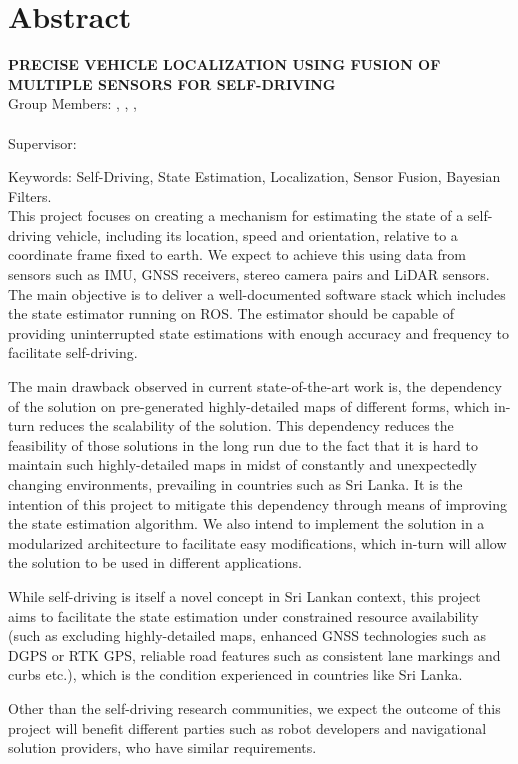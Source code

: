 \chapter*{Abstract}

\begin{center}
	\vspace{5mm}
	\MakeUppercase{\textbf{Precise Vehicle Localization Using Fusion of Multiple Sensors for Self-Driving}}\\
	\vspace{5mm}
	Group Members: \memberA, \memberB, \memberC, \\ \memberD \\
	\vspace{5mm}
	Supervisor: \supervisorA \\
	\vspace{5mm}
\end{center}

\noindent Keywords: Self-Driving, State Estimation, Localization, Sensor Fusion, Bayesian Filters. \\

This project focuses on creating a mechanism for estimating the state of a self-driving vehicle, including its location, speed and orientation, relative to a coordinate frame fixed to earth. We expect to achieve this using data from sensors such as \gls{IMU}, \gls{GNSS} receivers, stereo camera pairs and \gls{LiDAR} sensors. The main objective is to deliver a well-documented software stack which includes the state estimator running on \gls{ROS}. The estimator should be capable of providing uninterrupted state estimations with enough accuracy and frequency to facilitate self-driving.

The main drawback observed in current state-of-the-art work is, the dependency of the solution on pre-generated highly-detailed maps of different forms, which in-turn reduces the scalability of the solution. This dependency reduces the feasibility of those solutions in the long run due to the fact that it is hard to maintain such highly-detailed maps in midst of constantly and unexpectedly changing environments, prevailing in countries such as Sri Lanka. It is the intention of this project to mitigate this dependency through means of improving the state estimation algorithm. We also intend to implement the solution in a modularized architecture to facilitate easy modifications, which in-turn will allow the solution to be used in different applications.

While self-driving is itself a novel concept in Sri Lankan context, this project aims to facilitate the state estimation under constrained resource availability (such as excluding highly-detailed maps, enhanced \gls{GNSS} technologies such as \gls{DGPS} or \gls{RTK} \gls{GPS}, reliable road features such as consistent lane markings and curbs etc.), which is the condition experienced in  countries like Sri Lanka. 

Other than the self-driving research communities, we expect the outcome of this project will benefit different parties such as robot developers and navigational solution providers, who have similar requirements.